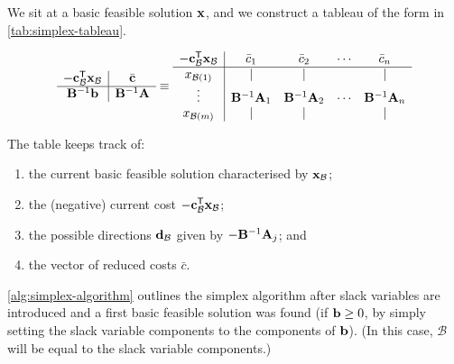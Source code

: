 \documentclass[11pt]{article}
\theoremstyle{definition}
\theoremstyle{remark}
\newcommand{\pqty}[1]{\left(#1\right)}
\newcommand{\transpose}{^{\mathsf{T}}}
\newcommand{\inverse}{^{-1}}
\begin{document}
We sit at a basic feasible solution \(\vb{x}\), and we construct a tableau of the form in \autoref{tab:simplex-tableau}.

\begin{table}[ht!]
    \centering
    \[\begin{array}{c|c}
        - \vb{c}_{\mathcal{B}}\transpose \vb{x}_{\mathcal{B}} & \bar{\vb{c}} \\
        \hline
        \vb{B}\inverse \vb{b} & \vb{B}\inverse \vb{A}
    \end{array}
    \equiv
    \begin{array}{c|cccc}
        - \vb{c}_{\mathcal{B}}\transpose \vb{x}_{\mathcal{B}} & \bar{c}_1 & \bar{c}_2 & \cdots & \bar{c}_n \\
        \hline
        x_{\mathcal{B}\pqty{1}} & | & | & & | \\
        \vdots & \vb{B}\inverse \vb{A}_1 & \vb{B}\inverse \vb{A}_2 & \cdots & \vb{B}\inverse \vb{A}_n \\
        x_{\mathcal{B}\pqty{m}} & | & | & & |
    \end{array}
    \]
    \caption{Simplex Tableau}
    \label{tab:simplex-tableau}
\end{table}

The table keeps track of:
\begin{enumerate}
    \item the current basic feasible solution characterised by \(\vb{x}_{\mathcal{B}}\);
    \item the (negative) current cost \(- \vb{c}_{\mathcal{B}}\transpose \vb{x}_{\mathcal{B}}\);
    \item the possible directions \(\vb{d}_{\mathcal{B}}\) given by \(-\vb{B}\inverse \vb{A}_j\); and
    \item the vector of reduced costs \(\bar{c}\).
\end{enumerate}

\autoref{alg:simplex-algorithm} outlines the simplex algorithm after slack variables are introduced and a first basic feasible solution was found (if \(\vb{b} \geq 0\), by simply setting the slack variable components to the components of \(\vb{b}\)). (In this case, \(\mathcal{B}\) will be equal to the slack variable components.)
\end{document}
